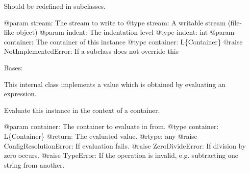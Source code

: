 \documentclass[a4paper,10pt,english]{sphinxmanual}
\begin{document}
\begin{fulllineitems}
\begin{fulllineitems}
Should be redefined in subclasses.

@param stream: The stream to write to
@type stream: A writable stream (file-like object)
@param indent: The indentation level
@type indent: int
@param container: The container of this instance
@type container: L\{Container\}
@raise NotImplementedError: If a subclass does not override this

\end{fulllineitems}


\begin{fulllineitems}
\label{commands/apidoc/src:src.pyconf.Container.writeValue}
\end{fulllineitems}


\end{fulllineitems}


\begin{fulllineitems}
\label{commands/apidoc/src:src.pyconf.Expression}
Bases: 

This internal class implements a value which is obtained by evaluating an expression.

\begin{fulllineitems}
\label{commands/apidoc/src:src.pyconf.Expression.evaluate}
Evaluate this instance in the context of a container.

@param container: The container to evaluate in from.
@type container: L\{Container\}
@return: The evaluated value.
@rtype: any
@raise ConfigResolutionError: If evaluation fails.
@raise ZeroDivideError: If division by zero occurs.
@raise TypeError: If the operation is invalid, e.g.
subtracting one string from another.

\end{fulllineitems}


\end{fulllineitems}

\end{document}
